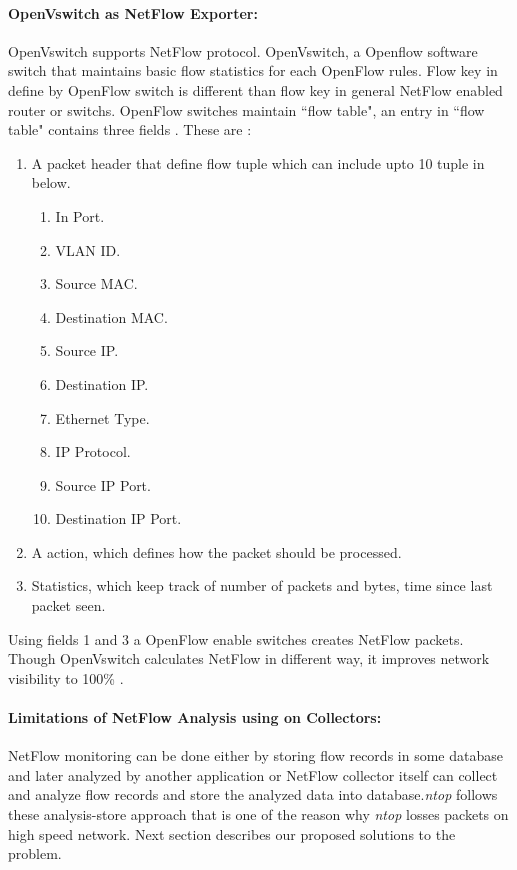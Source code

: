     \paragraph{OpenVswitch as NetFlow Exporter:} OpenVswitch supports NetFlow protocol. OpenVswitch, a Openflow software switch that 
    maintains basic flow statistics for each OpenFlow rules. Flow key in define by OpenFlow switch is different than 
    flow key in general NetFlow enabled router or switchs. OpenFlow switches maintain ``flow table", an entry in ``flow table"
    contains three fields . These are :
    \begin{enumerate}
     \item A packet header that define flow tuple which can include upto 10 tuple in below.
	  \begin{enumerate}
	   \item In Port.
	   \item VLAN ID.
	   \item Source MAC.
	   \item Destination MAC.
	   \item Source IP.
	   \item Destination IP.
	   \item Ethernet Type.
	   \item IP Protocol.
	   \item Source IP Port.
	   \item Destination IP Port.
	  \end{enumerate}
      \item A action, which defines how the packet should be processed.
      \item Statistics, which keep track of number of packets and bytes, time since last packet seen.
    \end{enumerate}
    Using fields 1 and 3 a OpenFlow enable switches creates NetFlow packets. Though OpenVswitch calculates NetFlow in different way, 
    it improves network visibility to 100\% \cite{sdnnetflow}.
    \paragraph{Limitations of NetFlow Analysis using on Collectors:} 
    NetFlow monitoring can be done either by storing flow records in some database and later analyzed by another application or 
    NetFlow collector itself can collect and analyze flow records and store the analyzed data into database.\emph{ntop} follows these
    analysis-store approach that is one of the reason why \emph{ntop} losses packets on high speed network. Next section describes our 
    proposed solutions to the problem.
    
